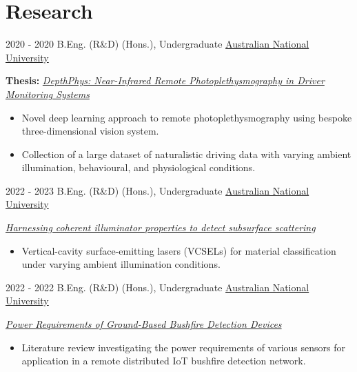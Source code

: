 \documentclass[letterpaper]{twentysecondcv} %
\begin{document}
\section{Research}
\begin{twenty}
	\twentyitem
    	{2020 - 2020}
		{}
        {B.Eng. (R\&D) (Hons.), Undergraduate}
        {\href{https://www.anu.edu.au}{Australian National University}}
        {}
        {
       	\textbf{Thesis:} \href{https://timothyalder.github.io/tplat/docs/projects_research_research.output/thesis.pdf}{\textit{DepthPhys: Near-Infrared Remote Photoplethysmography in Driver Monitoring Systems}}
        {\begin{itemize}
        \item Novel deep learning approach to remote photoplethysmography using bespoke three-dimensional vision system.
        \item Collection of a large dataset of naturalistic driving data with varying ambient illumination, behavioural, and physiological conditions.
        \vspace{2mm}
		\end{itemize}}
        }
    \twentyitem
    	{2022 - 2023}
		{}
        {B.Eng. (R\&D) (Hons.), Undergraduate}
        {\href{https://www.anu.edu.au}{Australian National University}}
        {}
        {
       	\href{https://timothyalder.github.io/tplat/docs/projects_research_research.output/vcsel.pdf}{\textit{Harnessing coherent illuminator properties to detect subsurface scattering}}
        {\begin{itemize}
        \item Vertical-cavity surface-emitting lasers (VCSELs) for material classification under varying ambient illumination conditions.
        \vspace{2mm}
		\end{itemize}}
        }
    \twentyitem
    	{2022 - 2022}
		{}
        {B.Eng. (R\&D) (Hons.), Undergraduate}
        {\href{https://www.anu.edu.au}{Australian National University}}
        {}
        {
       	\href{https://timothyalder.github.io/tplat/docs/projects_research_research.output/bushfire.pdf}{\textit{Power Requirements of Ground-Based Bushfire Detection Devices}}
        {\begin{itemize}
        \item Literature review investigating the power requirements of various sensors for application in a remote distributed IoT bushfire detection network.
        \end{itemize}}
        }
\end{twenty}
\end{document}

